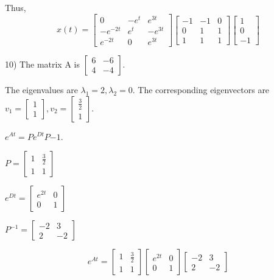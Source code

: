 \documentclass{article}
\begin{document}
Thus,
\[x(t) = \begin{bmatrix}
    0 & -e^{t} & e^{3t} \\
    -e^{-2t} & e^t & -e^{3t} \\
    e^{-2t} & 0 & e^{3t}
\end{bmatrix} \begin{bmatrix}
    -1 & -1 & 0 \\
    0 & 1 & 1 \\
    1 & 1 & 1
\end{bmatrix} \begin{bmatrix}
    1 \\
    0 \\
    -1
\end{bmatrix}\]

10) The matrix A is $\begin{bmatrix}
    6 & -6 \\
    4 & -4
\end{bmatrix}$.

The eigenvalues are $\lambda_1 = 2, \lambda_2 = 0$.
The corresponding eigenvectors are $v_1 = \begin{bmatrix}
    1 \\
    1
\end{bmatrix}, v_2 = \begin{bmatrix}
    \frac{3}{2} \\
    1
\end{bmatrix}$.

$e^{At} = P e^{Dt} P{-1}$.

$P = \begin{bmatrix}
    1 & \frac{3}{2} \\
    1 & 1
\end{bmatrix}$

$e^{Dt} = \begin{bmatrix}
    e^{2t} & 0 \\
    0 & 1
\end{bmatrix}$

$P^{-1} = \begin{bmatrix}
    -2 & 3 \\
    2 & -2
\end{bmatrix}$

\[e^{At} = \begin{bmatrix}
    1 & \frac{3}{2} \\
    1 & 1
\end{bmatrix} \begin{bmatrix}
    e^{2t} & 0 \\
    0 & 1
\end{bmatrix} \begin{bmatrix}
    -2 & 3 \\
    2 & -2
\end{bmatrix}\]
\end{document}

